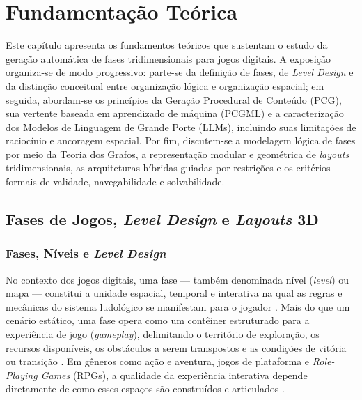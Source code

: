 \section{Fundamentação Teórica}
\label{sec:fundamentacao}

Este capítulo apresenta os fundamentos teóricos que sustentam o estudo da geração automática de fases tridimensionais para jogos digitais. A exposição organiza-se de modo progressivo: parte-se da definição de fases, de \textit{Level Design} e da distinção conceitual entre organização lógica e organização espacial; em seguida, abordam-se os princípios da Geração Procedural de Conteúdo (PCG), sua vertente baseada em aprendizado de máquina (PCGML) e a caracterização dos Modelos de Linguagem de Grande Porte (LLMs), incluindo suas limitações de raciocínio e ancoragem espacial. Por fim, discutem-se a modelagem lógica de fases por meio da Teoria dos Grafos, a representação modular e geométrica de \textit{layouts} tridimensionais, as arquiteturas híbridas guiadas por restrições e os critérios formais de validade, navegabilidade e solvabilidade.

\subsection{Fases de Jogos, \textit{Level Design} e \textit{Layouts} 3D}
\label{sec:level_design}

\subsubsection{Fases, Níveis e \textit{Level Design}}
\label{sec:fases_niveis}

No contexto dos jogos digitais, uma fase --- também denominada nível (\textit{level}) ou mapa --- constitui a unidade espacial, temporal e interativa na qual as regras e mecânicas do sistema ludológico se manifestam para o jogador \cite{tanagra, pcgbook}. Mais do que um cenário estático, uma fase opera como um contêiner estruturado para a experiência de jogo (\textit{gameplay}), delimitando o território de exploração, os recursos disponíveis, os obstáculos a serem transpostos e as condições de vitória ou transição \cite{tanagra, linden2014dungeons}. Em gêneros como ação e aventura, jogos de plataforma e \textit{Role-Playing Games} (RPGs), a qualidade da experiência interativa depende diretamente de como esses espaços são construídos e articulados \cite{dormans2010, linden2014dungeons}.

